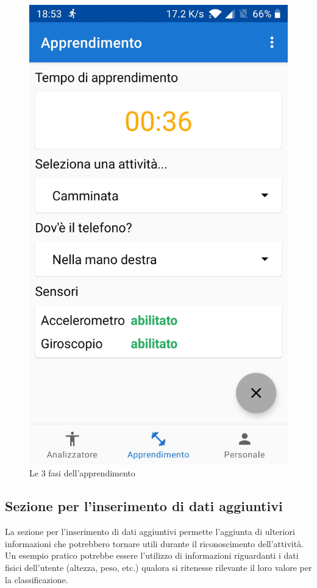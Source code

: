 \begin{figure}[H]
    \includegraphics[scale = 0.1019]{assets/images/screenshots/2c_Learning.jpg}
    \caption{Le 3 fasi dell'apprendimento}
    \label{fig:screenshots_learning}
\end{figure}


\subsection{Sezione per l'inserimento di dati aggiuntivi}
La sezione per l'inserimento di dati aggiuntivi permette l'aggiunta di ulteriori informazioni 
che potrebbero tornare utili durante il riconoscimento dell'attività.
Un esempio pratico potrebbe essere l'utilizzo di informazioni riguardanti i dati fisici dell'utente (altezza, peso, etc.) qualora 
si ritenesse rilevante il loro valore per la classificazione.

